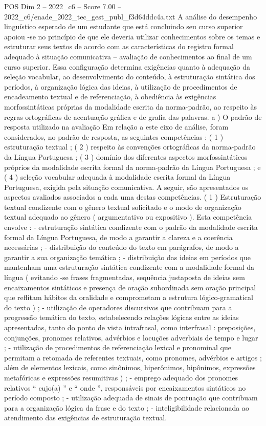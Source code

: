 \begin{textsample}{POS Dim 2 – 2022\_c6 – Score 7.00 – 2022\_c6/enade\_2022\_tec\_gest\_publ\_f3d64ddc4a.txt}
A análise do desempenho linguístico esperado de um estudante que está concluindo seu curso superior apoiou -se no princípio de que ele deveria utilizar conhecimentos sobre os temas e estruturar seus textos de acordo com as características do registro formal adequado à situação comunicativa – avaliação de conhecimentos ao final de um curso superior.
Essa configuração determina exigências quanto à adequação da seleção vocabular, ao desenvolvimento do conteúdo, à estruturação sintática dos períodos, à organização lógica das ideias, à utilização de procedimentos de encadeamento textual e de referenciação, à obediência às exigências morfossintáticas próprias da modalidade escrita da norma-padrão, ao respeito às regras ortográficas de acentuação gráfica e de grafia das palavras. a ) O padrão de resposta utilizado na avaliação Em relação a este eixo de análise, foram considerados, no padrão de resposta, as seguintes competências : ( 1 ) estruturação textual ; ( 2 ) respeito às convenções ortográficas da norma-padrão da Língua Portuguesa ; ( 3 ) domínio dos diferentes aspectos morfossintáticos próprios da modalidade escrita formal da norma-padrão da Língua Portuguesa ; e ( 4 ) seleção vocabular adequada à modalidade escrita formal da Língua Portuguesa, exigida pela situação comunicativa.
A seguir, são apresentados os aspectos avaliados associados a cada uma destas competências. ( 1 ) Estruturação textual condizente com o gênero textual solicitado e o modo de organização textual adequado ao gênero ( argumentativo ou expositivo ).
Esta competência envolve : - estruturação sintática condizente com o padrão da modalidade escrita formal da Língua Portuguesa, de modo a garantir a clareza e a coerência necessárias ; - distribuição do conteúdo do texto em parágrafos, de modo a garantir a sua organização temática ; - distribuição das ideias em períodos que mantenham uma estruturação sintática condizente com a modalidade formal da língua ( evitando -se frases fragmentadas, sequência justaposta de ideias sem encaixamentos sintáticos e presença de oração subordinada sem oração principal que reflitam hábitos da oralidade e comprometam a estrutura lógico-gramatical do texto ) ; - utilização de operadores discursivos que contribuam para a progressão temática do texto, estabelecendo relações lógicas entre as ideias apresentadas, tanto do ponto de vista intrafrasal, como interfrasal : preposições, conjunções, pronomes relativos, advérbios e locuções adverbiais de tempo e lugar ; - utilização de procedimentos de referenciação lexical e pronominal que permitam a retomada de referentes textuais, como pronomes, advérbios e artigos ; além de elementos lexicais, como sinônimos, hiperônimos, hipônimos, expressões metafóricas e expressões resumitivas ) ; - emprego adequado dos pronomes relativos “ cujo(a) ” e “ onde ”, responsáveis por encaixamentos sintáticos no período composto ; - utilização adequada de sinais de pontuação que contribuam para a organização lógica da frase e do texto ; - inteligibilidade relacionada ao atendimento das exigências de estruturação textual.

\end{textsample}
